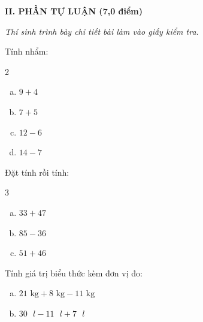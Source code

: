 \vspace{4mm}
\textbf{\large II. PHẦN TỰ LUẬN (7,0 điểm)}

{\itshape Thí sinh trình bày chi tiết bài làm vào giấy kiểm tra.}

\begin{bt}[1,0 điểm]
Tính nhẩm:
\begin{multicols}{2}
\begin{enumerate}[a)]
  \item $9 + 4$
  \item $7 + 5$
  \item $12 - 6$
  \item $14 - 7$
\end{enumerate}
\end{multicols}
\end{bt}

\begin{bt}[1,5 điểm]
Đặt tính rồi tính:
\begin{multicols}{3}
\begin{enumerate}[a)]
  \item $33 + 47$
  \item $85 - 36$
  \item $51 + 46$
\end{enumerate}
\end{multicols}
\end{bt}

\begin{bt}[1,0 điểm]
Tính giá trị biểu thức kèm đơn vị đo:
\begin{enumerate}[a)]
  \item $21\text{ kg} + 8\text{ kg} - 11\text{ kg}$
  \item $30\text{ }l - 11\text{ }l + 7\text{ }l$
\end{enumerate}
\end{bt}

